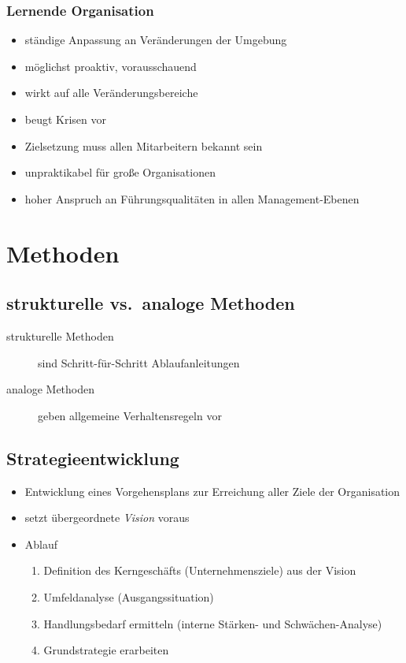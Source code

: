 \documentclass[a4paper, 12pt]{article}
\begin{document}
\subsubsection*{Lernende Organisation}
\begin{itemize}
  \item ständige Anpassung an Veränderungen der Umgebung
  \item möglichst proaktiv, vorausschauend
  \item wirkt auf alle Veränderungsbereiche
\end{itemize}
\begin{itemize}
  \renewcommand{\labelitemi}{+}%
  \item beugt Krisen vor
\end{itemize}
\begin{itemize}
  \renewcommand{\labelitemi}{\(-\)}%
  \item Zielsetzung muss allen Mitarbeitern bekannt sein
  \item unpraktikabel für große Organisationen
  \item hoher Anspruch an Führungsqualitäten in allen Management-Ebenen
\end{itemize}



\section{Methoden}


\subsection{strukturelle vs.\ analoge Methoden}
\begin{description}
  \item[strukturelle Methoden] sind Schritt-für-Schritt Ablaufanleitungen
  \item[analoge Methoden] geben allgemeine Verhaltensregeln vor
\end{description}


\subsection{Strategieentwicklung}
\begin{itemize}
  \item Entwicklung eines Vorgehensplans zur Erreichung aller Ziele der Organisation
  \item setzt übergeordnete \emph{Vision} voraus
  \item Ablauf
    \begin{enumerate}
      \item Definition des Kerngeschäfts (Unternehmensziele) aus der Vision
      \item Umfeldanalyse (Ausgangssituation)
      \item Handlungsbedarf ermitteln (interne Stärken- und Schwächen-Analyse)
      \item Grundstrategie erarbeiten
    \end{enumerate}
\end{itemize}
\end{document}
